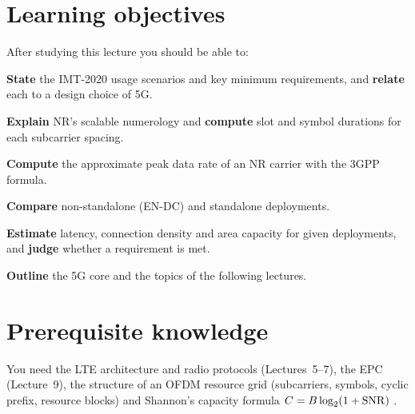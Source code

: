 \documentclass[11pt,a4paper]{article}
\begin{document}
\ACNcover

\section{Learning objectives}
After studying this lecture you should be able to:
\begin{objectives}
  \item \textbf{State} the IMT-2020 usage scenarios and key minimum requirements, and \textbf{relate}
        each to a design choice of 5G.
  \item \textbf{Explain} NR's scalable numerology and \textbf{compute} slot and symbol durations for
        each subcarrier spacing.
  \item \textbf{Compute} the approximate peak data rate of an NR carrier with the 3GPP formula.
  \item \textbf{Compare} non-standalone (EN-DC) and standalone deployments.
  \item \textbf{Estimate} latency, connection density and area capacity for given deployments, and
        \textbf{judge} whether a requirement is met.
  \item \textbf{Outline} the 5G core and the topics of the following lectures.
\end{objectives}

\section{Prerequisite knowledge}
You need the LTE architecture and radio protocols (Lectures~5--7), the EPC (Lecture~9), the structure of
an OFDM resource grid (subcarriers, symbols, cyclic prefix, resource blocks) and Shannon's capacity
formula $C = B\log_2(1+\mathrm{SNR})$ \cite{shannon1948mathematical}.
\end{document}
